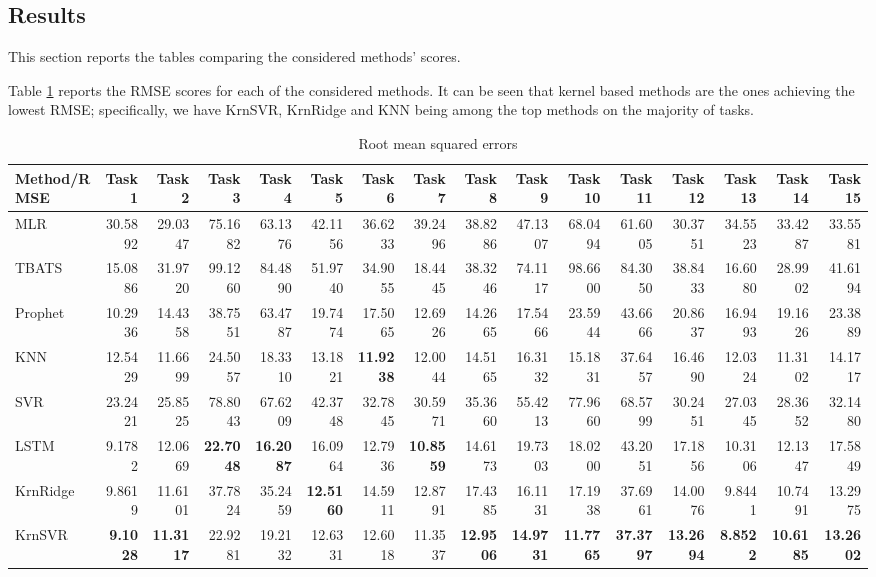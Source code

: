 \subsection{Results}
This section reports the tables comparing the considered methods' scores.

Table \ref{tab:point_RMSE} reports the RMSE scores for each of the considered methods. It can be seen that kernel based methods are the ones achieving the lowest RMSE; specifically, we have KrnSVR, KrnRidge and KNN being among the top methods on the majority of tasks.

\begin{table}[!ht]
    \caption{Root mean squared errors}
    \label{tab:point_RMSE}
    \begin{adjustbox}{width=\textwidth}
        \begin{tabular}{lrrrrrrrrrrrrrrr}
            \toprule
            Method/RMSE & Task 1 & Task 2 & Task 3 & Task 4 & Task 5 & Task 6 & Task 7 & Task 8 & Task 9 & Task 10 & Task 11 & Task 12 & Task 13 & Task 14 & Task 15 \\
            \midrule
            MLR & 30.5892 & 29.0347 & 75.1682 & 63.1376 & 42.1156 & 36.6233 & 39.2496 & 38.8286 & 47.1307 & 68.0494 & 61.6005 & 30.3751 & 34.5523 & 33.4287 & 33.5581 \\
            TBATS & 15.0886 & 31.9720 & 99.1260 & 84.4890 & 51.9740 & 34.9055 & 18.4445 & 38.3246 & 74.1117 & 98.6600 & 84.3050 & 38.8433 & 16.6080 & 28.9902 & 41.6194 \\
            Prophet & 10.2936 & 14.4358 & 38.7551 & 63.4787 & 19.7474 & 17.5065 & 12.6926 & 14.2665 & 17.5466 & 23.5944 & 43.6666 & 20.8637 & 16.9493 & 19.1626 & 23.3889 \\
            KNN & 12.5429 & 11.6699 & 24.5057 & 18.3310 & 13.1821 & \textbf{11.9238} & 12.0044 & 14.5165 & 16.3132 & 15.1831 & 37.6457 & 16.4690 & 12.0324 & 11.3102 & 14.1717 \\
            SVR & 23.2421 & 25.8525 & 78.8043 & 67.6209 & 42.3748 & 32.7845 & 30.5971 & 35.3660 & 55.4213 & 77.9660 & 68.5799 & 30.2451 & 27.0345 & 28.3652 & 32.1480 \\
            LSTM & 9.1782 & 12.0669 & \textbf{22.7048} & \textbf{16.2087} & 16.0964 & 12.7936 & \textbf{10.8559} & 14.6173 & 19.7303 & 18.0200 & 43.2051 & 17.1856 & 10.3106 & 12.1347 & 17.5849 \\
            KrnRidge & 9.8619 & 11.6101 & 37.7824 & 35.2459 & \textbf{12.5160} & 14.5911 & 12.8791 & 17.4385 & 16.1131 & 17.1938 & 37.6961 & 14.0076 & 9.8441 & 10.7491 & 13.2975 \\
            KrnSVR & \textbf{9.1028} & \textbf{11.3117} & 22.9281 & 19.2132 & 12.6331 & 12.6018 & 11.3537 & \textbf{12.9506} & \textbf{14.9731} & \textbf{11.7765} & \textbf{37.3797} & \textbf{13.2694} & 
            \textbf{8.8522} & \textbf{10.6185} & \textbf{13.2602} \\
            \bottomrule
            \end{tabular}            
    \end{adjustbox}
\end{table}


